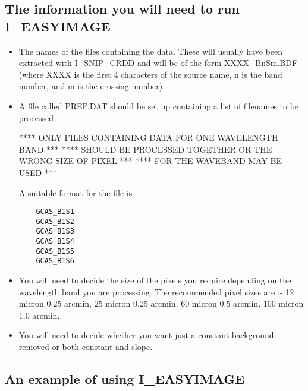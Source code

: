 \subsection {The information you will need to run I\_EASYIMAGE}

\begin {itemize}

\item The names of the files containing the data. These will usually have been
extracted with I\_SNIP\_CRDD and will be of the form XXXX\_BnSm.BDF
(where XXXX is the first 4 characters of the source name, n is the band
number, and m is the crossing number).

\item A file called PREP.DAT should be set up containing a list of filenames to
be processed

**** \hfill ONLY FILES CONTAINING DATA FOR ONE WAVELENGTH BAND \hfill****
\linebreak
**** \hfill SHOULD BE PROCESSED TOGETHER OR THE WRONG SIZE OF PIXEL \hfill****
\linebreak
**** \hfill FOR THE WAVEBAND MAY BE USED \hfill****

A suitable format for the file is :-

\begin{verbatim}
	GCAS_B1S1
	GCAS_B1S2
	GCAS_B1S3
	GCAS_B1S4
	GCAS_B1S5
	GCAS_B1S6
\end{verbatim}

\item You will need to decide the size of the pixels you require depending
on the wavelength band you are processing. The recommended pixel sizes are :-
12 micron  0.25 arcmin, 25 micron  0.25 arcmin, 60 micron   0.5 arcmin,
100 micron  1.0 arcmin.

\item You will need to decide whether you want just a constant background
removed or both constant and slope.

\end {itemize}

\pagebreak

\subsection{An example of using I\_EASYIMAGE}

